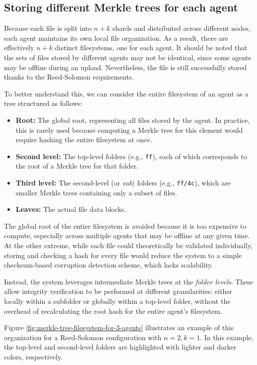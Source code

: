 \subsection{Storing different Merkle trees for each agent}

Because each file is split into $n+k$ shards and distributed across different nodes, each agent maintains its own local file organization. As a result, there are effectively $n+k$ distinct filesystems, one for each agent. It should be noted that the sets of files stored by different agents may not be identical, since some agents may be offline during an upload. Nevertheless, the file is still successfully stored thanks to the Reed-Solomon requirements.

To better understand this, we can consider the entire filesystem of an agent as a tree structured as follows:
\begin{itemize}
    \item \textbf{Root:} The global root, representing all files stored by the agent. In practice, this is rarely used because computing a Merkle tree for this element would require hashing the entire filesystem at once.
    \item \textbf{Second level:} The top-level folders (e.g., \texttt{ff}), each of which corresponds to the root of a Merkle tree for that folder.
    \item \textbf{Third level:} The second-level (or \emph{sub}) folders (e.g., \texttt{ff/4c}), which are smaller Merkle trees containing only a subset of files.
    \item \textbf{Leaves:} The actual file data blocks.
\end{itemize}

The global root of the entire filesystem is avoided because it is too expensive to compute, especially across multiple agents that may be offline at any given time. At the other extreme, while each file could theoretically be validated individually, storing and checking a hash for every file would reduce the system to a simple checksum-based corruption detection scheme, which lacks scalability.  

Instead, the system leverages intermediate Merkle trees at the \emph{folder levels}. These allow integrity verification to be performed at different granularities: either locally within a subfolder or globally within a top-level folder, without the overhead of recalculating the root hash for the entire agent's filesystem.

Figure \ref{fig:merkle-tree-filesystem-for-3-agents} illustrates an example of this organization for a Reed-Solomon configuration with $n=2, k=1$. In this example, the top-level and second-level folders are highlighted with lighter and darker colors, respectively.


